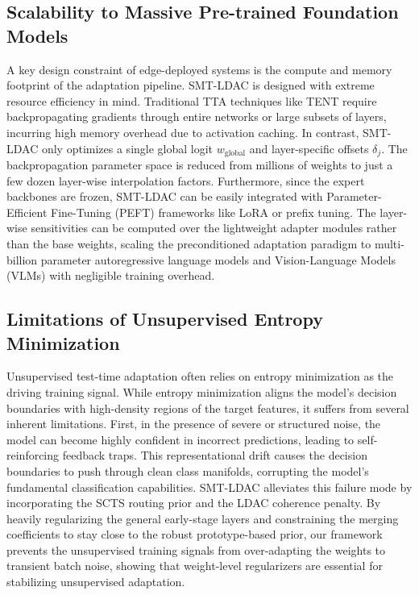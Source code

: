 \documentclass{article}
\theoremstyle{plain}
\theoremstyle{definition}
\theoremstyle{remark}
\begin{document}
\subsection{Scalability to Massive Pre-trained Foundation Models}
A key design constraint of edge-deployed systems is the compute and memory footprint of the adaptation pipeline. SMT-LDAC is designed with extreme resource efficiency in mind. Traditional TTA techniques like TENT require backpropagating gradients through entire networks or large subsets of layers, incurring high memory overhead due to activation caching. In contrast, SMT-LDAC only optimizes a single global logit $w_{\text{global}}$ and layer-specific offsets $\delta_j$. The backpropagation parameter space is reduced from millions of weights to just a few dozen layer-wise interpolation factors. Furthermore, since the expert backbones are frozen, SMT-LDAC can be easily integrated with Parameter-Efficient Fine-Tuning (PEFT) frameworks like LoRA \cite{hu2021lora} or prefix tuning. The layer-wise sensitivities can be computed over the lightweight adapter modules rather than the base weights, scaling the preconditioned adaptation paradigm to multi-billion parameter autoregressive language models and Vision-Language Models (VLMs) with negligible training overhead.

\subsection{Limitations of Unsupervised Entropy Minimization}
Unsupervised test-time adaptation often relies on entropy minimization as the driving training signal. While entropy minimization aligns the model's decision boundaries with high-density regions of the target features, it suffers from several inherent limitations. First, in the presence of severe or structured noise, the model can become highly confident in incorrect predictions, leading to self-reinforcing feedback traps. This representational drift causes the decision boundaries to push through clean class manifolds, corrupting the model's fundamental classification capabilities. SMT-LDAC alleviates this failure mode by incorporating the SCTS routing prior and the LDAC coherence penalty. By heavily regularizing the general early-stage layers and constraining the merging coefficients to stay close to the robust prototype-based prior, our framework prevents the unsupervised training signals from over-adapting the weights to transient batch noise, showing that weight-level regularizers are essential for stabilizing unsupervised adaptation.
\end{document}

